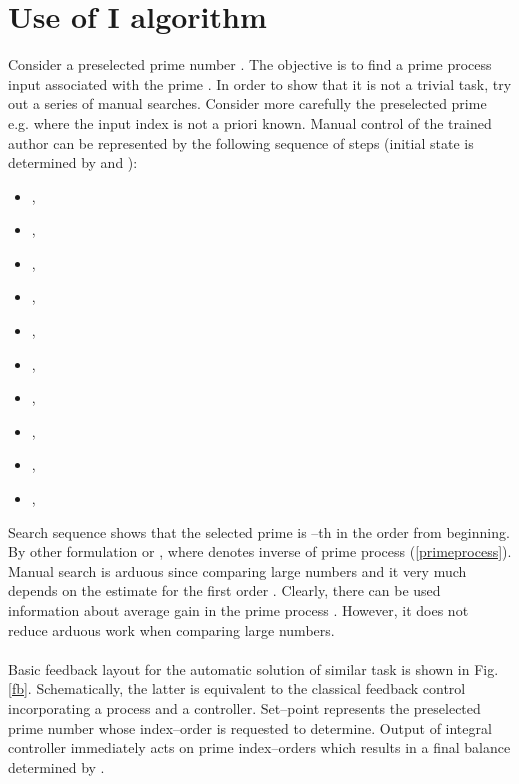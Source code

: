 \documentclass[12pt,a4paper,twoside]{article}
\begin{document}
\section{Use of I algorithm}   

\vspace{0.3cm}\noindent Consider a preselected prime number . The objective is to find a prime process input  associated with the prime . In order to show that it is not a trivial task, try out a series of manual searches. Consider more carefully the preselected prime e.g.  where the input index is not a priori known. Manual control of the trained author can be represented by the following sequence of  steps (initial state is determined by  and ): 

\begin{itemize}
\item ,  
\item , 
\item , 
\item , 
\item , 
\item , 
\item , 
\item , 
\item , 
\item , 
\end{itemize}  
Search sequence shows that the selected prime is --th in the order from beginning. By other formulation  or , where  denotes inverse of prime process (\ref{primeprocess}). Manual search is arduous since comparing large numbers and it very much depends on the estimate for the first order . Clearly, there can be used information about average gain in the prime process . However, it does not reduce arduous work when comparing large numbers.\\
\\
Basic feedback layout for the automatic solution of similar task is shown in Fig. \ref{fb}.  Schematically, the latter is equivalent to the classical feedback control incorporating a process and a controller. Set--point  represents the preselected prime number whose index--order is requested to determine. Output of integral controller immediately acts on prime index--orders which results in a final balance determined by .
\end{document}

